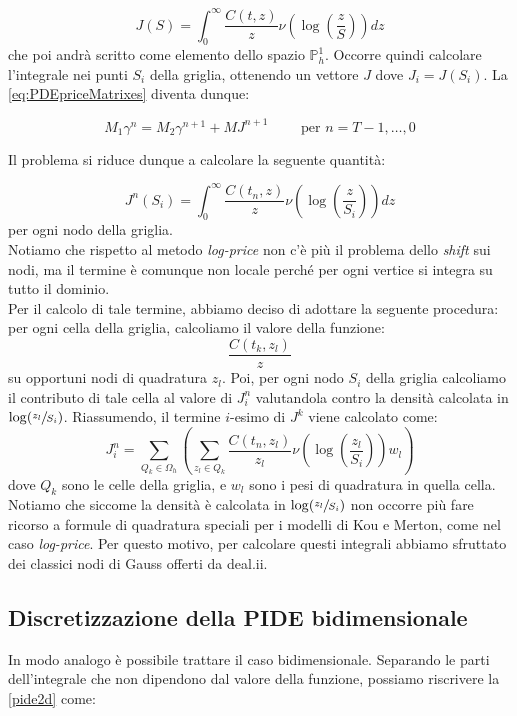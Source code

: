 \documentclass[a4paper,10pt]{report}
\theoremstyle{plain}
\theoremstyle{definition}
\theoremstyle{remark}
\begin{document}
\begin{equation*}
 J(S)=\int_0^\infty \frac{C(t,z)}{z}\nu\left(\log\left(\frac{z}{S}\right) \right)dz
\end{equation*}
che poi andrà scritto come elemento dello spazio $\mathbb{P}_h^1$. Occorre quindi calcolare l'integrale nei punti $S_i$ della griglia, ottenendo un vettore $J$ dove $J_i=J(S_i)$. La \eqref{eq:PDEpriceMatrixes} diventa dunque: 
 
\begin{equation}
 \label{eq:PDEpriceMatrixeswithJ}
 M_1\gamma^n=M_2\gamma^{n+1}+MJ^{n+1} \qquad \text{ per } n=T-1,\dots,0
\end{equation}

Il problema si riduce dunque a calcolare la seguente quantità:

\begin{equation*}
 J^n(S_i)=\int_0^\infty \frac{C(t_n,z)}{z}\nu\left(\log\left(\frac{z}{S_i}\right) \right)dz
\end{equation*}
per ogni nodo della griglia.\\
Notiamo che rispetto al metodo \emph{log-price} non c'è più il problema dello \emph{shift} sui nodi, ma il termine è comunque non locale perché per ogni vertice si integra su tutto il dominio.\\
Per il calcolo di tale termine, abbiamo deciso di adottare la seguente procedura: per ogni cella della griglia, calcoliamo il valore della funzione: $$\frac{C(t_k,z_l)}{z}$$ su opportuni nodi di quadratura $z_l$. Poi, per ogni nodo $S_i$ della griglia calcoliamo il contributo di tale cella al valore di $J^n_i$ valutandola contro la densità calcolata in $\log(\sfrac{z_l}{S_i})$.
Riassumendo, il termine $i$-esimo di $J^k$ viene calcolato come:
\begin{equation*}
J^n_i=\sum\limits_{Q_k\in \Omega_h}\left( \sum\limits_{z_l\in Q_k}\frac{C(t_n,z_l)}{z_l}\nu\left(\log\left(\frac{z_l}{S_i}\right)\right)w_l\right)
\end{equation*}
dove $Q_k$ sono le celle della griglia, e $w_l$ sono i pesi di quadratura in quella cella. Notiamo che siccome la densità è calcolata in $\log(\sfrac{z_l}{S_i})$ non occorre pi\`u fare ricorso a formule di quadratura speciali per i modelli di Kou e Merton, come nel caso \emph{log-price}. Per questo motivo, per calcolare questi integrali abbiamo sfruttato dei classici nodi di Gauss offerti da \textsf{deal.ii}.

\subsection{Discretizzazione della PIDE bidimensionale}
In modo analogo è possibile trattare il caso bidimensionale. Separando le parti dell'integrale che non dipendono dal valore della funzione, possiamo riscrivere la \eqref{pide2d} come:
\end{document}
